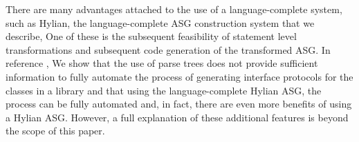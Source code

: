There are many advantages attached to the use of a language-complete
system, such as Hylian, the language-complete ASG 
construction system that we describe,
One of these is the subsequent feasibility of statement 
level transformations and 
subsequent code generation of the transformed ASG.
In reference \cite{IJSEKE},
We show that the use of parse trees does not provide sufficient
information to fully automate the process of generating interface
protocols for the classes in a library and that using the 
language-complete Hylian ASG, the process can be fully automated and, 
in fact, there are even more benefits of using a Hylian ASG.
However, a full explanation of these additional features is
beyond the scope of this paper.


